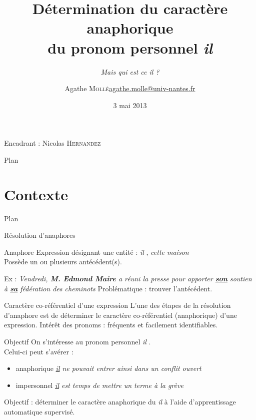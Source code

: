 \documentclass{beamer}
\title[Mais qui est ce \og \textit{il} \fg{} ?]{Détermination du caractère anaphorique\\ du pronom personnel \og{}\textit{il}\fg{}}
\subtitle{\textit{Mais qui est ce \og il \fg{} ?}}
\author{\texorpdfstring{Agathe \textsc{Mollé}\newline\url{agathe.molle@univ-nantes.fr}}{Author}}
\institute{Université de Nantes}
\date{3 mai 2013}
\begin{document}
\begin{frame}
  \titlepage
  \begin{center}
  Encadrant : Nicolas \textsc{Hernandez}
  \end{center}
\end{frame}

\begin{frame}{Plan}
  \tableofcontents
\end{frame}


\section{Contexte}

\begin{frame}{Plan}
  \tableofcontents[currentsection]
\end{frame}

\begin{frame}{Résolution d'anaphores}
\begin{block}{Anaphore}
Expression désignant une entité : \og \textit{il} \fg{}, \og \textit{cette maison} \fg{} \\
Possède un ou plusieurs antécédent(s).\\
\end{block}
Ex : \og \textit{Vendredi, \textbf{M. Edmond Maire} a réuni la presse pour apporter \underline{\textbf{son}} soutien à \underline{\textbf{sa}} fédération des cheminots} \fg{}
\vskip 1cm
Problématique : trouver l'antécédent.\\
\end{frame}

\begin{frame}{Caractère co-référentiel d'une expression}
L'une des étapes de la résolution d'anaphore est de déterminer le caractère co-référentiel (anaphorique) d'une expression.
\vskip 1cm
Intérêt des pronoms : fréquents et facilement identifiables.
\end{frame}

\begin{frame}{Objectif}
On s'intéresse au pronom personnel \og \textit{il} \fg{}.\\
Celui-ci peut s'avérer :
\begin{itemize}
  \item anaphorique \og{}\textit{\underline{il} ne pouvait entrer ainsi dans un conflit ouvert}\fg{}
  \item impersonnel \og{}\textit{\underline{il} est temps de mettre un terme à la grève}\fg{}
\end{itemize}
\vskip 1cm
Objectif : déterminer le caractère anaphorique du \og \textit{il} \fg{} à l'aide d'apprentissage automatique supervisé.
\end{frame}
\end{document}
